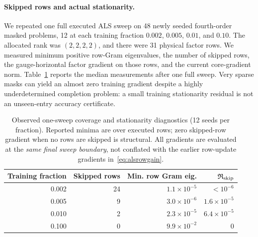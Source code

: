 \documentclass[review,10pt]{elsarticle}
\begin{document}
\paragraph{Skipped rows and actual stationarity.}
We repeated one full executed ALS sweep on 48 newly seeded fourth-order masked problems, 12 at each training fraction $0.002$, $0.005$, $0.01$, and $0.10$. The allocated rank was $(2,2,2,2)$, and there were 31 physical factor rows. We measured minimum positive row-Gram eigenvalues, the number of skipped rows, the gauge-horizontal factor gradient on those rows, and the current core-gradient norm. Table~\ref{tab:skiprows} reports the median measurements after one full sweep. Very sparse masks can yield an almost zero training gradient despite a highly underdetermined completion problem: a small training stationarity residual is not an unseen-entry accuracy certificate.
\begin{table}[tbp]
\caption{Observed one-sweep coverage and stationarity diagnostics (12 seeds per fraction). Reported minima are over executed rows; zero skipped-row gradient when no rows are skipped is structural. All gradients are evaluated at the \emph{same final sweep boundary}, not conflated with the earlier row-update gradients in~\eqref{eq:alsrowgain}.}\label{tab:skiprows}
\centering\small
\begin{tabular}{rrrr}
\toprule
Training fraction & Skipped rows & Min. row Gram eig. & $\mathfrak R_{\rm skip}$\\
\midrule
0.002 & 24 & $1.1\times10^{-5}$ & $<10^{-6}$\\
0.005 & 9 & $3.0\times10^{-6}$ & $1.6\times10^{-5}$\\
0.010 & 2 & $2.3\times10^{-5}$ & $6.4\times10^{-5}$\\
0.100 & 0 & $9.9\times10^{-2}$ & $0$\\
\bottomrule
\end{tabular}
\end{table}
\end{document}
